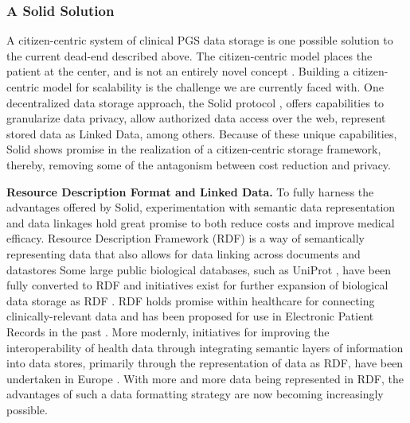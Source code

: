 \documentclass[runningheads]{llncs}
\begin{document}
\subsubsection{A Solid Solution} 
A citizen-centric system of clinical PGS data storage is one possible solution to the current dead-end described above. 
The citizen-centric model places the patient at the center, and is not an entirely novel concept \cite{brands_patient-centered_2022}.
Building a citizen-centric model for scalability is the challenge we are currently faced with.
One decentralized data storage approach, the Solid protocol \cite{capadisli_solid_nodate}, offers capabilities to granularize data privacy, allow authorized data access over the web, represent stored data as Linked Data, among others.
Because of these unique capabilities, Solid shows promise in the realization of a citizen-centric storage framework, thereby, removing some of the antagonism between cost reduction and privacy.


\textbf{Resource Description Format and Linked Data.}
To fully harness the advantages offered by Solid, experimentation with semantic data representation and data linkages hold great promise to both reduce costs and improve medical efficacy.
Resource Description Framework (RDF) is a way of semantically representing data that also allows for data linking across documents and datastores
Some large public biological databases, such as UniProt \cite{theuniprotconsortium_uniprot_2017}, have been fully converted to RDF and initiatives exist for further expansion of biological data storage as RDF \cite{sib_swiss_institute_of_bioinformatics_rdf_group_members_sib_2024}.
RDF holds promise within healthcare for connecting clinically-relevant data and has been proposed for use in Electronic Patient Records in the past \cite{lindemann_resource_2008}.
More modernly, initiatives for improving the interoperability of health data through integrating semantic layers of information into data stores, primarily through the representation of data as RDF, have been undertaken in Europe \cite{van_der_horst_bridging_2023}.
With more and more data being represented in RDF, the advantages of such a data formatting strategy are now becoming increasingly possible.
\end{document}
